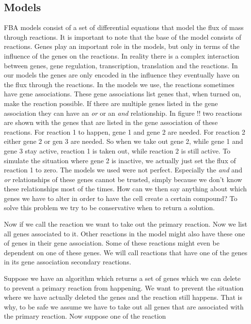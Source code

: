 \documentclass[12pt]{report}
\begin{document}
\subsection{Models}\label{sec:intro_models}
FBA models consist of a set of differential equations that model the flux of mass through reactions. It is important to note that the base of the model consists of reactions.
Genes play an important role in the models, but only in terms of the influence of the genes on the reactions.
In reality there is a complex interaction between genes, gene regulation, transcription, translation and the reactions.
In our models the genes are only encoded in the influence they eventually have on the flux through the reactions.
In the models we use, the reactions sometimes have gene associations.
These gene associations list genes that, when turned on, make the reaction possible.
If there are multiple genes listed in the gene association they can have an \emph{or} or an \emph{and} relationship.
In figure !! two reactions are shown with the genes that are listed in the gene association of these reactions.
For reaction 1 to happen, gene 1 and gene 2 are needed. For reaction 2 either gene 2 or gen 3 are needed. So when we take out gene 2, while gene 1 and gene 3 stay active, reaction 1 is taken out, while reaction 2 is still active. To simulate the situation where gene 2 is inactive, we actually just set the flux of reaction 1 to zero.
The models we used were not perfect. Especially the \emph{and} and \emph{or} relationships of these genes cannot be trusted, simply because we don't know these relationships most of the times.
How can we then say anything about which genes we have to alter in order to have the cell create a certain compound?
To solve this problem we try to be conservative when to return a solution.


Now if we call the reaction we want to take out the primary reaction. Now we list all genes associated to it. Other reactions in the model might also have these one of genes in their gene association. Some of these reactions might even be dependent on one of these genes. We will call reactions that have one of the genes in its gene association secondary reactions.

Suppose we have an algorithm which returns a set of genes which we can delete to prevent a primary reaction from happening. We want to prevent the situation where we have actually deleted the genes and the reaction still happens. That is why, to be safe we assume we have to take out all genes that are associated with the primary reaction. Now suppose one of the reaction
\end{document}
